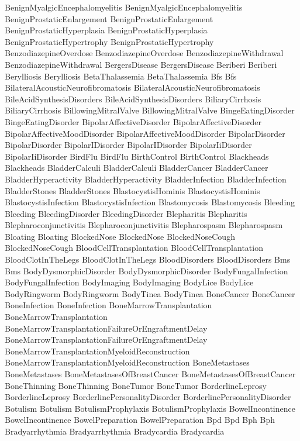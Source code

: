  BenignMyalgicEncephalomyelitis
 BenignMyalgicEncephalomyelitis
 BenignProstaticEnlargement
 BenignProstaticEnlargement
 BenignProstaticHyperplasia
 BenignProstaticHyperplasia
 BenignProstaticHypertrophy
 BenignProstaticHypertrophy
 BenzodiazepineOverdose
 BenzodiazepineOverdose
 BenzodiazepineWithdrawal
 BenzodiazepineWithdrawal
 BergersDisease
 BergersDisease
 Beriberi
 Beriberi
 Berylliosis
 Berylliosis
 BetaThalassemia
 BetaThalassemia
 Bfs
 Bfs
 BilateralAcousticNeurofibromatosis
 BilateralAcousticNeurofibromatosis
 BileAcidSynthesisDisorders
 BileAcidSynthesisDisorders
 BiliaryCirrhosis
 BiliaryCirrhosis
 BillowingMitralValve
 BillowingMitralValve
 BingeEatingDisorder
 BingeEatingDisorder
 BipolarAffectiveDisorder
 BipolarAffectiveDisorder
 BipolarAffectiveMoodDisorder
 BipolarAffectiveMoodDisorder
 BipolarDisorder
 BipolarDisorder
 BipolarIDisorder
 BipolarIDisorder
 BipolarIiDisorder
 BipolarIiDisorder
 BirdFlu
 BirdFlu
 BirthControl
 BirthControl
 Blackheads
 Blackheads
 BladderCalculi
 BladderCalculi
 BladderCancer
 BladderCancer
 BladderHyperactivity
 BladderHyperactivity
 BladderInfection
 BladderInfection
 BladderStones
 BladderStones
 BlastocystisHominis
 BlastocystisHominis
 BlastocystisInfection
 BlastocystisInfection
 Blastomycosis
 Blastomycosis
 Bleeding
 Bleeding
 BleedingDisorder
 BleedingDisorder
 Blepharitis
 Blepharitis
 Blepharoconjunctivitis
 Blepharoconjunctivitis
 Blepharospasm
 Blepharospasm
 Bloating
 Bloating
 BlockedNose
 BlockedNose
 BlockedNoseCough
 BlockedNoseCough
 BloodCellTransplantation
 BloodCellTransplantation
 BloodClotInTheLegs
 BloodClotInTheLegs
 BloodDisorders
 BloodDisorders
 Bms
 Bms
 BodyDysmorphicDisorder
 BodyDysmorphicDisorder
 BodyFungalInfection
 BodyFungalInfection
 BodyImaging
 BodyImaging
 BodyLice
 BodyLice
 BodyRingworm
 BodyRingworm
 BodyTinea
 BodyTinea
 BoneCancer
 BoneCancer
 BoneInfection
 BoneInfection
 BoneMarrowTransplantation
 BoneMarrowTransplantation
 BoneMarrowTransplantationFailureOrEngraftmentDelay
 BoneMarrowTransplantationFailureOrEngraftmentDelay
 BoneMarrowTransplantationMyeloidReconstruction
 BoneMarrowTransplantationMyeloidReconstruction
 BoneMetastases
 BoneMetastases
 BoneMetastasesOfBreastCancer
 BoneMetastasesOfBreastCancer
 BoneThinning
 BoneThinning
 BoneTumor
 BoneTumor
 BorderlineLeprosy
 BorderlineLeprosy
 BorderlinePersonalityDisorder
 BorderlinePersonalityDisorder
 Botulism
 Botulism
 BotulismProphylaxis
 BotulismProphylaxis
 BowelIncontinence
 BowelIncontinence
 BowelPreparation
 BowelPreparation
 Bpd
 Bpd
 Bph
 Bph
 Bradyarrhythmia
 Bradyarrhythmia
 Bradycardia
 Bradycardia
